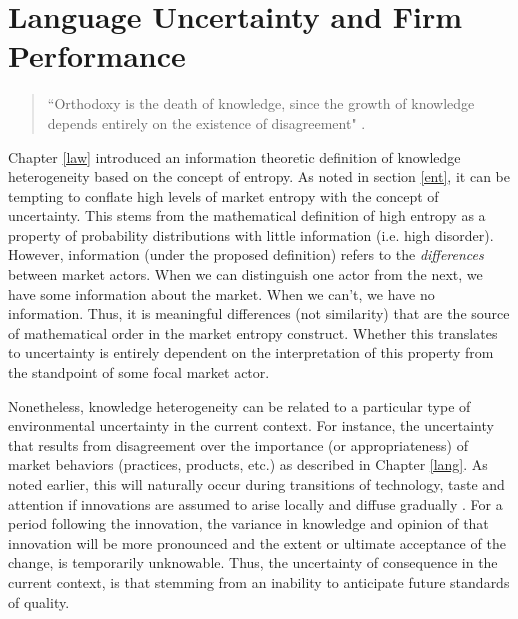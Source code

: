 \chapter{Language Uncertainty and Firm Performance \label{signal}}


\begin{small}
\begin{quote}
``Orthodoxy is the death of knowledge, since the growth of knowledge depends entirely on the existence of disagreement" \citep[p. 34]{popper1994}.
\end{quote}
\end{small}

Chapter \ref{law} introduced an information theoretic definition of knowledge heterogeneity based on the concept of entropy. As noted in section \ref{ent}, it can be tempting to conflate high levels of market entropy with the concept of uncertainty. This stems from the mathematical definition of high entropy as a property of probability distributions with little information (i.e. high disorder). However, information (under the proposed definition) refers to the \emph{differences} between market actors. When we can distinguish one actor from the next, we have some information about the market. When we can't, we have no information. Thus, it is meaningful differences (not similarity) that are the source of mathematical order in the market entropy construct. Whether this translates to uncertainty is entirely dependent on the interpretation of this property from the standpoint of some focal market actor.

Nonetheless, knowledge heterogeneity can be related to a particular type of environmental uncertainty in the current context. For instance, the uncertainty that results from disagreement over the importance (or appropriateness) of market behaviors (practices, products, etc.) as described in Chapter \ref{lang}. As noted earlier, this will naturally occur during transitions of technology, taste and attention if innovations are assumed to arise locally and diffuse gradually \citep{colyvas2007, rogers2002}. For a period following the innovation, the variance in knowledge and opinion of that innovation will be more pronounced and the extent or ultimate acceptance of the change, is temporarily unknowable. Thus, the uncertainty of consequence in the current context, is that stemming from an inability to anticipate future standards of quality.

